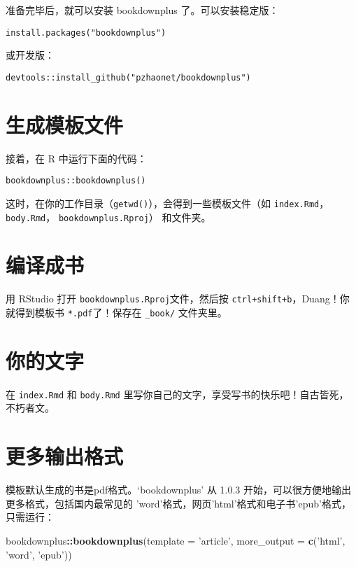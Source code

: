 \documentclass[doublesided]{Style/ucasthesis}%
\newenvironment{Shaded}{\begin{snugshade}}{\end{snugshade}}
\newcommand{\KeywordTok}[1]{\textcolor[rgb]{0.13,0.29,0.53}{\textbf{{#1}}}}
\newcommand{\DataTypeTok}[1]{\textcolor[rgb]{0.13,0.29,0.53}{{#1}}}
\newcommand{\StringTok}[1]{\textcolor[rgb]{0.31,0.60,0.02}{{#1}}}
\newcommand{\OperatorTok}[1]{\textcolor[rgb]{0.81,0.36,0.00}{\textbf{{#1}}}}
\newcommand{\NormalTok}[1]{{#1}}
\begin{document}
准备完毕后，就可以安装 bookdownplus 了。可以安装稳定版：

\begin{verbatim}
install.packages("bookdownplus")
\end{verbatim}

或开发版：

\begin{verbatim}
devtools::install_github("pzhaonet/bookdownplus")
\end{verbatim}

\hypertarget{section-4}{%
\section{生成模板文件}\label{section-4}}

接着，在 R 中运行下面的代码：

\begin{verbatim}
bookdownplus::bookdownplus()
\end{verbatim}

这时，在你的工作目录（\texttt{getwd()}），会得到一些模板文件（如 \texttt{index.Rmd}，\texttt{body.Rmd}， \texttt{bookdownplus.Rproj}） 和文件夹。

\hypertarget{section-5}{%
\section{编译成书}\label{section-5}}

用 RStudio 打开 \texttt{bookdownplus.Rproj}文件，然后按 \texttt{ctrl+shift+b}，Duang！你就得到模板书 \texttt{*.pdf}了！保存在 \texttt{\_book/} 文件夹里。

\hypertarget{section-6}{%
\section{你的文字}\label{section-6}}

在 \texttt{index.Rmd} 和 \texttt{body.Rmd} 里写你自己的文字，享受写书的快乐吧！自古皆死，不朽者文。

\hypertarget{section-7}{%
\section{更多输出格式}\label{section-7}}

模板默认生成的书是pdf格式。`bookdownplus' 从 1.0.3 开始，可以很方便地输出更多格式，包括国内最常见的 'word'格式，网页'html'格式和电子书'epub'格式，只需运行：

\begin{Shaded}
\begin{Highlighting}[]
\NormalTok{bookdownplus}\OperatorTok{::}\KeywordTok{bookdownplus}\NormalTok{(}\DataTypeTok{template =} \StringTok{'article'}\NormalTok{, }
    \DataTypeTok{more_output =} \KeywordTok{c}\NormalTok{(}\StringTok{'html'}\NormalTok{, }\StringTok{'word'}\NormalTok{, }\StringTok{'epub'}\NormalTok{))}
\end{Highlighting}
\end{Shaded}
\end{document}

